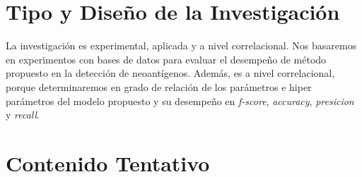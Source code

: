 \documentclass[a4paper]{article}
\begin{document}
\section{Tipo y Diseño de la Investigación}

La investigación es experimental, aplicada y a nivel correlacional. Nos basaremos en experimentos con bases de datos para evaluar el desempeño de método propuesto en la detección de neoantígenos. Además, es a nivel correlacional, porque determinaremos en grado de relación de los parámetros e hiper parámetros del modelo propuesto y su desempeño en \textit{f-score}, \textit{accuracy}, \textit{presicion} y \textit{recall}.



\section{Contenido Tentativo}
\end{document}
